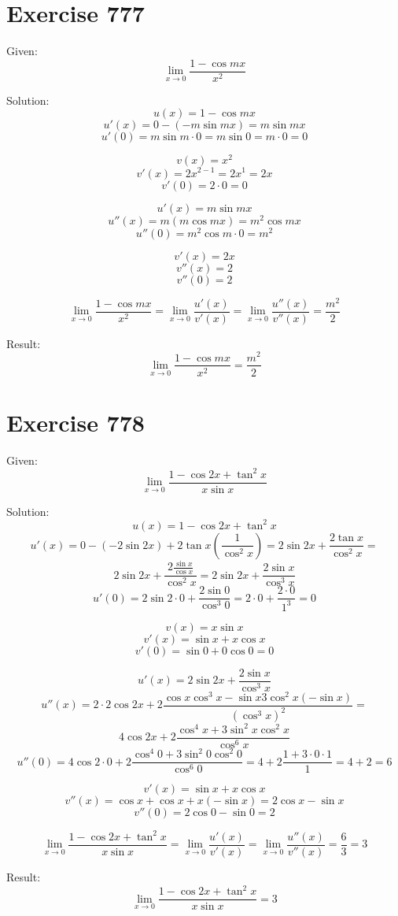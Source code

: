 \documentclass[a4paper, 10pt]{scrartcl}
\begin{document}
\section{Exercise 777}

Given:
\[
\lim_{x\to 0}{\frac{1 - \cos{mx}}{x^{2}}}
\]

Solution:
\[
u(x) = 1 - \cos{mx}
\]
\[
u'(x) = 0 - (-m\sin{mx}) = m\sin{mx}
\]
\[
u'(0) = m\sin{m\cdot 0} = m\sin{0} = m\cdot 0 = 0
\]

\[
v(x) = x^{2}
\]
\[
v'(x) = 2x^{2 - 1} = 2x^{1} = 2x
\]
\[
v'(0) = 2\cdot 0 = 0
\]

\[
u'(x) = m\sin{mx}
\]
\[
u''(x) = m(m\cos{mx}) = m^{2}\cos{mx}
\]
\[
u''(0) = m^{2}\cos{m\cdot 0} = m^{2}
\]

\[
v'(x) = 2x
\]
\[
v''(x) = 2
\]
\[
v''(0) = 2
\]

\[
\lim_{x\to 0}{\frac{1 - \cos{mx}}{x^{2}}} = \lim_{x\to 0}{\frac{u'(x)}{v'(x)}} = \lim_{x\to 0}{\frac{u''(x)}{v''(x)}}
= \frac{m^{2}}{2}
\]

Result:
\[
\lim_{x\to 0}{\frac{1 - \cos{mx}}{x^{2}}} = \frac{m^{2}}{2}
\]

\section{Exercise 778}

Given:
\[
\lim_{x\to 0}{\frac{1 - \cos{2x} + \tan^{2}{x}}{x\sin{x}}}
\]

Solution:
\[
u(x) = 1 - \cos{2x} + \tan^{2}{x}
\]
\[
u'(x) = 0 - (-2\sin{2x}) + 2\tan{x}(\frac{1}{\cos^{2}{x}}) = 2\sin{2x} + \frac{2\tan{x}}{\cos^{2}{x}} =
\]
\[
2\sin{2x} + \frac{2\frac{\sin{x}}{\cos{x}}}{\cos^{2}{x}} = 2\sin{2x} + \frac{2\sin{x}}{\cos^{3}{x}}
\]
\[
u'(0) = 2\sin{2\cdot 0} + \frac{2\sin{0}}{\cos^{3}{0}} = 2\cdot 0 + \frac{2\cdot 0}{1^{3}} = 0
\]

\[
v(x) = x\sin{x}
\]
\[
v'(x) = \sin{x} + x\cos{x}
\]
\[
v'(0) = \sin{0} + 0\cos{0} = 0
\]

\[
u'(x) = 2\sin{2x} + \frac{2\sin{x}}{\cos^{3}{x}}
\]
\[
u''(x) = 2\cdot 2\cos{2x} + 2\frac{\cos{x}\cos^{3}{x} - \sin{x}3\cos^{2}{x}(-\sin{x})}{(\cos^{3}{x})^{2}} =
\]
\[
4\cos{2x} + 2\frac{\cos^{4}{x} + 3\sin^{2}{x}\cos^{2}{x}}{\cos^{6}{x}}
\]
\[
u''(0) = 4\cos{2\cdot 0} + 2\frac{\cos^{4}{0} + 3\sin^{2}{0}\cos^{2}{0}}{\cos^{6}{0}} = 4 + 2\frac{1 + 3\cdot 0\cdot 1}{1} = 4 + 2 = 6
\]

\[
v'(x) = \sin{x} + x\cos{x}
\]
\[
v''(x) = \cos{x} + \cos{x} + x(-\sin{x}) = 2\cos{x} - \sin{x}
\]
\[
v''(0) = 2\cos{0} - \sin{0} = 2
\]

\[
\lim_{x\to 0}{\frac{1 - \cos{2x} + \tan^{2}{x}}{x\sin{x}}} = \lim_{x\to 0}{\frac{u'(x)}{v'(x)}} = \lim_{x\to 0}{\frac{u''(x)}{v''(x)}} =
\frac{6}{3} = 3
\]

Result:
\[
\lim_{x\to 0}{\frac{1 - \cos{2x} + \tan^{2}{x}}{x\sin{x}}} = 3
\]
\end{document}
